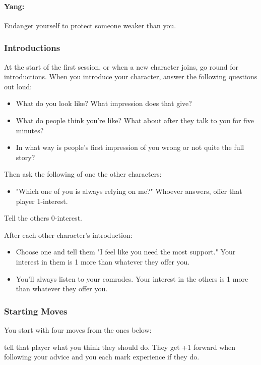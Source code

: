 \paragraph{Yang:} Endanger yourself to protect someone weaker than you.

\subsubsection{Introductions}
At the start of the first session, or when a new character joins, go round for introductions.
When you introduce your character, answer the following questions out loud:
\begin{itemize}
\item What do you look like? What impression does that give?
\item What do people think you're like? What about after they talk to you for five minutes?
\item In what way is people's first impression of you wrong or not quite the full story?
\end{itemize}

Then ask the following of one the other characters:
\begin{itemize}
\item "Which one of you is always relying on me?" Whoever answers, offer that player 1-interest.
\end{itemize}
Tell the others 0-interest.

After each other character's introduction:
\begin{itemize}
\item Choose one and tell them "I feel like you need the most support." Your interest in them is 1 more than whatever they offer you.
\item You'll always listen to your comrades. Your interest in the others is 1 more than whatever they offer you.
\end{itemize}

\subsubsection{Starting Moves}
You start with four moves from the ones below:


{tell that player what you think they should do. They get +1 forward
when following your advice and you each mark experience if they do.}
           
